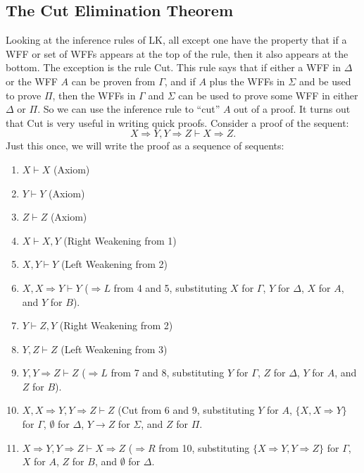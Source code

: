 \documentclass[11pt]{article}
\theoremstyle{definition}
\theoremstyle{remark}
\begin{document}
\subsection{The Cut Elimination Theorem}
Looking at the inference rules of LK, all except one have the property that if a WFF or set of WFFs appears at the top of the rule, then it also appears at the bottom. The exception is the rule Cut. This rule says that if either a WFF in $\Delta$ or the WFF $A$ can be proven from $\Gamma$, and if $A$ plus the WFFs in $\Sigma$ and be used to prove $\Pi$, then the WFFs in $\Gamma$ and $\Sigma$ can be used to prove some WFF in either $\Delta$ or $\Pi$. So we can use the inference rule to ``cut'' $A$ out of a proof. It turns out that Cut is very useful in writing quick proofs. Consider a proof of the sequent:
$$X\Rightarrow Y, Y\Rightarrow Z \vdash X\Rightarrow Z.$$
Just this once, we will write the proof as a sequence of sequents:
    \begin{enumerate}
        \item $X\vdash X$ (Axiom)

        \item $Y\vdash Y$ (Axiom)

        \item $Z\vdash Z$ (Axiom)

        \item $X\vdash X, Y$ (Right Weakening from 1)

        \item $X,Y \vdash Y$ (Left Weakening from 2)

        \item $X,X\Rightarrow Y \vdash Y$ ($\Rightarrow L$ from 4 and 5, substituting $X$ for $\Gamma$, $Y$ for $\Delta$, $X$ for $A$, and $Y$ for $B$).

        \item $Y\vdash Z, Y$ (Right Weakening from 2)

        \item $Y,Z\vdash Z$ (Left Weakening from 3)

        \item $Y,Y\Rightarrow Z \vdash Z$ ($\Rightarrow L$ from 7 and 8, substituting $Y$ for $\Gamma$, $Z$ for $\Delta$, $Y$ for $A$, and $Z$ for $B$).

        \item $X, X \Rightarrow Y, Y \Rightarrow Z \vdash Z$ (Cut from 6 and 9, substituting $Y$ for $A$, $\{X,X\Rightarrow Y\}$ for $\Gamma$, $\emptyset$ for $\Delta$, $Y\rightarrow Z$ for $\Sigma$, and $Z$ for $\Pi$. 

        \item $X \Rightarrow Y, Y \Rightarrow Z \vdash X\Rightarrow Z$ ($\Rightarrow R$ from 10, substituting $\{X \Rightarrow Y, Y \Rightarrow Z\}$ for $\Gamma$, $X$ for $A$, $Z$ for $B$, and $\emptyset$ for $\Delta$. 
    \end{enumerate}
\end{document}
